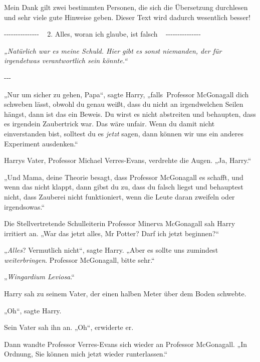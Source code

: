 

\hypertarget{alles-woran-ich-glaube-ist-falsch}{%

Mein Dank gilt zwei bestimmten Personen, die sich die Übersetzung durchlesen und sehr viele gute Hinweise geben. Dieser Text wird dadurch wesentlich besser!

-\/-\/-\/-\/-\/-\/-\/-\/-\/-\/-\/-\/-\/-\/- ~ 2. Alles, woran ich glaube, ist falsch ~ -\/-\/-\/-\/-\/-\/-\/-\/-\/-\/-\/-\/-\/-\/-

\emph{„Natürlich war es meine Schuld. Hier gibt es sonst niemanden, der für irgendetwas verantwortlich sein könnte.“}

-\/-\/-

„Nur um sicher zu gehen, Papa“, sagte Harry, „falls~Professor McGonagall dich schweben lässt, obwohl du genau weißt, dass du nicht an irgendwelchen Seilen hängst, dann ist das ein Beweis. Du wirst es nicht abstreiten und behaupten, dass es irgendein Zaubertrick war. Das wäre unfair. Wenn du damit nicht einverstanden bist, solltest du es \emph{jetzt} sagen, dann können wir uns ein anderes Experiment ausdenken.“

Harrys Vater, Professor Michael Verres-Evans, verdrehte die Augen. „Ja, Harry.“

„Und Mama, deine Theorie besagt, dass Professor McGonagall es schafft, und wenn das nicht klappt, dann gibst du zu, dass du falsch liegst und behauptest nicht, dass Zauberei nicht funktioniert, wenn die Leute daran zweifeln oder irgendsowas.“

Die Stellvertretende Schulleiterin Professor Minerva McGonagall sah Harry irritiert an. „War das jetzt alles, Mr Potter? Darf ich jetzt beginnen?“

„\emph{Alles}? Vermutlich nicht“, sagte Harry. „Aber es sollte uns zumindest \emph{weiterbringen}. Professor McGonagall, bitte sehr.“

„\emph{Wingardium Leviosa}.“

Harry sah zu seinem Vater, der einen halben Meter über dem Boden schwebte.

„Oh“, sagte Harry.

Sein Vater sah ihn an. „Oh“, erwiderte er.

Dann wandte Professor Verres-Evans sich wieder an Professor McGonagall. „In Ordnung, Sie können mich jetzt wieder runterlassen.“

}
